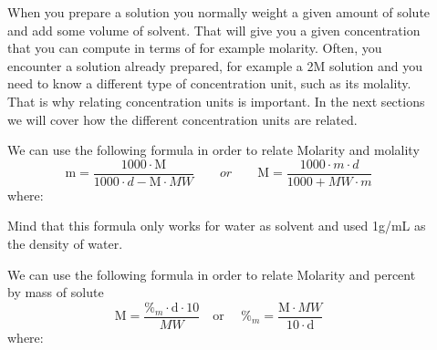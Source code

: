\documentclass[main.tex]{subfiles}
\newcommand\chapterlabel{physicalsolutions}
\begin{document}
\begin{description}
\item[] 
When you prepare a solution you normally weight a given amount of solute and add some volume of solvent. That will give you a given concentration that you can compute in terms of for example molarity. Often, you encounter a solution already prepared, for example a 2M solution and you need to know a different type of concentration unit, such as its molality. That is why relating concentration units is important. In the next sections we will cover how the different concentration units are related.
\item[] 
We can use the following formula in order to relate Molarity and molality
\begin{equation}
\boxed{ \text{m}=\frac{1000\cdot \text{M}}{1000\cdot d - \text{M}\cdot MW}}
\quad\quad or \quad\quad
\boxed{ \text{M}=\frac{ 1000\cdot m\cdot d   }{1000+MW\cdot m   	}}
\label{\chapterlabel:equation7}
\end{equation}
where:
Mind that this formula only works for water as solvent and used 1g/mL as the density of water.
\item[] 
We can use the following formula in order to relate Molarity and percent by mass of solute
\begin{equation}
\boxed{ \text{M}=\frac{\%_m \cdot \text{d}\cdot 10}{MW}}
\quad  \text{or }\quad 
\boxed{ \%_m=\frac{\text{M}\cdot MW }{10\cdot \text{d} }}
\label{\chapterlabel:equation8}
\end{equation}
where:


\end{description}
\end{document}
